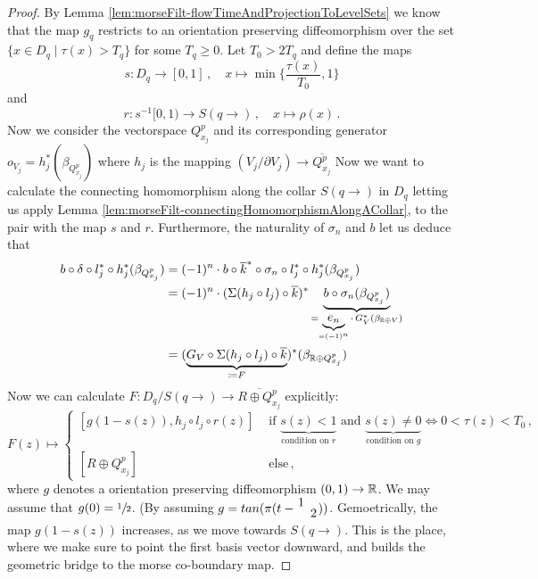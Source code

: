 \begin{proof}By Lemma \ref{lem:morseFilt-flowTimeAndProjectionToLevelSets} we know that the map $g_q$ restricts to an orientation preserving diffeomorphism over the set $\{x\in D_q \mid \tau(x)>T_q\}$ for some $T_q\geq 0$. Let $T_0>2T_q$ and define the maps 
	\begin{equation*}
		s:D_q\to [0,1]\,,\quad x\mapsto \min\{\frac{\tau(x)}{T_0},1\}
	\end{equation*}
and 
\begin{equation*}
	r:s^{-1}[0,1)\to S(q\to)\,,\quad x\mapsto \rho(x)\,.
\end{equation*}
Now we consider the vectorspace $Q_{x_j}^p$ and its corresponding generator $o_{V_j}=h_j^*(\beta_{Q_{x_j}^p})$ where $h_j$ is the mapping $(V_j/\partial V_j)\to \overline{Q_{x_j}^p}$ Now we want to calculate the connecting homomorphism along the collar $S(q\to)$ in $D_q$ letting us apply Lemma \ref{lem:morseFilt-connectingHomomorphismAlongACollar}, to the pair with the map $s$ and $r$.
Furthermore, the naturality of $\sigma_n$ and $b$ let us deduce
that
\begin{align}
	b\circ \delta \circ l_j^*\circ h_j^*(\beta_{Q_{x_j}^p})
	&=(-1)^n\cdot b\circ \overline{k}^*\circ \sigma_n \circ l_j^*\circ h_j^*(\beta_{Q_{x_j}^p})\label{eq:morseFiltr-boundaryMorphismInASingleFlowLine}\\
	&=(-1)^n\cdot (\Sigma(h_j\circ l_j)\circ \overline{k})^* \underbrace{b \circ \sigma_n(\beta_{Q_{x_j}^p})}_{=\underbrace{e_n}_{=(-1)^n}\cdot \,G_V^*(\beta_{\mathbb{R}\oplus V})} \notag\\
	&=(\underbrace{G_V\circ \Sigma(h_j\circ l_j)\circ \overline{k}}_{\coloneq F})^*(\beta_{\mathbb{R}\oplus Q_{x_j}^p}) \notag
\end{align}
Now we can calculate $F: D_q\big/S(q\to )\to \overline{R\oplus Q^p_{x_j}}$ explicitly:
\begin{equation*}
	F(z)\mapsto \begin{cases}
		[g(1-s(z)),h_j\circ l_j\circ r(z)]&
        \text{ if }
        \underbrace{s(z)<1}_{\text{condition on } r} 
        \text{ and }\underbrace{s(z)\neq 0}_{\text{condition on } g} \Leftrightarrow 0<\tau(z)<T_0\,,\\
		[R\oplus Q^p_{x_j}]& \text{ else}\,,
	\end{cases}
\end{equation*} where $g$ denotes a orientation preserving diffeomorphism $(0,1)\to \mathbb{R}$. We may assume that $g(0)=\sfrac{1}{2}$. (By assuming $g=tan(\pi(t-\splitfrac{1}{2}))$. 
Gemoetrically, the map $g(1-s(z))$ increases, as we move towards $S(q\to)$. This is the place, where we make sure to point the first basis vector downward, and builds the geometric bridge to the morse co-boundary map. 

\end{proof}
